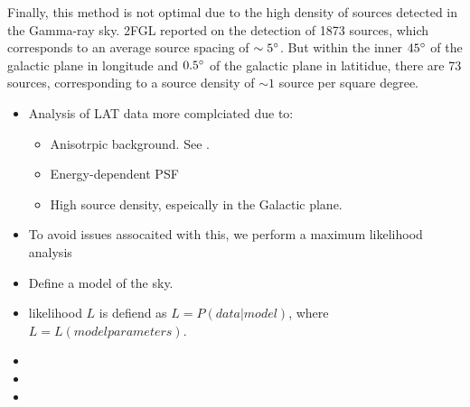 
Finally, this method is not optimal due to the high density
of sources detected in the Gamma-ray sky. 
\ac{2FGL} reported on the detection of 1873
sources,
which corresponds to an average source spacing of $\sim5^\circ$. 
But within the inner $45^\circ$ of the galactic plane
in longitude and $0.5^\circ$ of the galactic
plane in latitidue, there are 73 sources, corresponding to
a source density of $\sim 1$ source per square degree.





\begin{itemize}
  \item Analysis of LAT data more complciated due to:
    \begin{itemize}
      \item Anisotrpic background. See .
      \item Energy-dependent PSF
      \item High source density, espeically in the Galactic plane.
    \end{itemize}
  \item To avoid issues assocaited with this, we perform a maximum likelihood analysis
  \item Define a model of the sky.
  \item likelihood $L$ is defiend as $L=P(data|model)$, where $L=L(model parameters)$.
  \item {}
  \item {}
  \item {}
\end{itemize}

